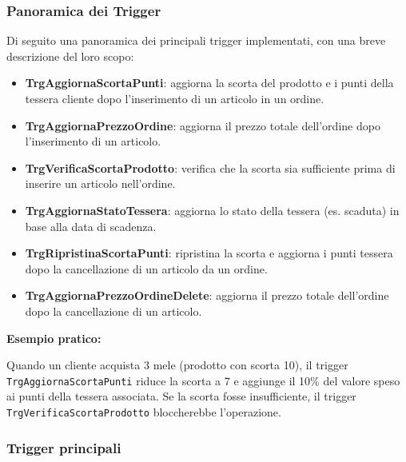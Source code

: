 \documentclass[a4paper,12pt]{article}
\begin{document}
\subsubsection*{Panoramica dei Trigger}
\noindent
Di seguito una panoramica dei principali trigger implementati, con una breve descrizione del loro scopo:
\begin{itemize}
    \item \textbf{TrgAggiornaScortaPunti}: aggiorna la scorta del prodotto e i punti della tessera cliente dopo l'inserimento di un articolo in un ordine.
    \item \textbf{TrgAggiornaPrezzoOrdine}: aggiorna il prezzo totale dell'ordine dopo l'inserimento di un articolo.
    \item \textbf{TrgVerificaScortaProdotto}: verifica che la scorta sia sufficiente prima di inserire un articolo nell'ordine.
    \item \textbf{TrgAggiornaStatoTessera}: aggiorna lo stato della tessera (es. scaduta) in base alla data di scadenza.
    \item \textbf{TrgRipristinaScortaPunti}: ripristina la scorta e aggiorna i punti tessera dopo la cancellazione di un articolo da un ordine.
    \item \textbf{TrgAggiornaPrezzoOrdineDelete}: aggiorna il prezzo totale dell'ordine dopo la cancellazione di un articolo.
\end{itemize}
\vspace{1em}
\textbf{Esempio pratico:}
\begin{tcolorbox}[colback=mygray,colframe=myblue]
Quando un cliente acquista 3 mele (prodotto con scorta 10), il trigger \texttt{TrgAggiornaScortaPunti} riduce la scorta a 7 e aggiunge il 10\% del valore speso ai punti della tessera associata. Se la scorta fosse insufficiente, il trigger \texttt{TrgVerificaScortaProdotto} bloccherebbe l'operazione.
\end{tcolorbox}


\subsubsection*{Trigger principali}
\end{document}
